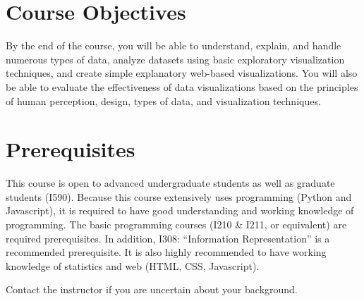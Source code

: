 \documentclass[11pt,article,oneside]{memoir}
\begin{document}
\section{Course Objectives}

By the end of the course, you will be able to understand, explain, and handle
numerous types of data, analyze datasets using basic exploratory visualization
techniques, and create simple explanatory web-based visualizations. You will
also be able to evaluate the effectiveness of data visualizations based on the
principles of human perception, design, types of data, and visualization
techniques. 
 




\section{Prerequisites}
\label{sec:Prerequisites}

This course is open to advanced undergraduate students as well as graduate
students (I590). Because this course extensively uses programming (Python and
Javascript), it is required to have good understanding and working knowledge of
programming. The basic programming courses (I210 \& I211, or equivalent) are
required prerequisites. In addition, I308: ``Information Representation'' is a
recommended prerequisite. It is also highly recommended to have working
knowledge of statistics and web (HTML, CSS, Javascript). 


Contact the instructor if you are uncertain about your background. 
\end{document}
